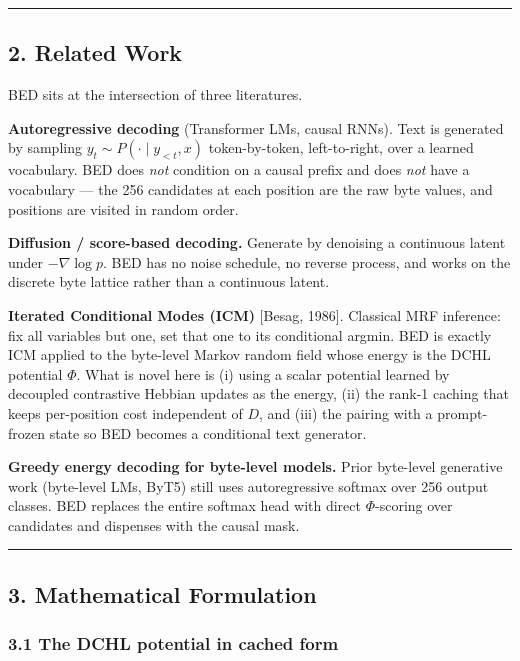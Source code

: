 \documentclass[
  11pt,
  a4paper,
]{article}
\begin{document}
\begin{center}\rule{0.5\linewidth}{0.5pt}\end{center}

\subsection{2. Related Work}\label{related-work}

BED sits at the intersection of three literatures.

\textbf{Autoregressive decoding} (Transformer LMs, causal RNNs). Text is
generated by sampling \(y_t \sim P(\cdot \mid y_{<t}, x)\)
token-by-token, left-to-right, over a learned vocabulary. BED does
\emph{not} condition on a causal prefix and does \emph{not} have a
vocabulary --- the 256 candidates at each position are the raw byte
values, and positions are visited in random order.

\textbf{Diffusion / score-based decoding.} Generate by denoising a
continuous latent under \(-\nabla \log p\). BED has no noise schedule,
no reverse process, and works on the discrete byte lattice rather than a
continuous latent.

\textbf{Iterated Conditional Modes (ICM)} {[}Besag, 1986{]}. Classical
MRF inference: fix all variables but one, set that one to its
conditional argmin. BED is exactly ICM applied to the byte-level Markov
random field whose energy is the DCHL potential \(\Phi\). What is novel
here is (i) using a scalar potential learned by decoupled contrastive
Hebbian updates as the energy, (ii) the rank-1 caching that keeps
per-position cost independent of \(D\), and (iii) the pairing with a
prompt-frozen state so BED becomes a conditional text generator.

\textbf{Greedy energy decoding for byte-level models.} Prior byte-level
generative work (byte-level LMs, ByT5) still uses autoregressive softmax
over 256 output classes. BED replaces the entire softmax head with
direct \(\Phi\)-scoring over candidates and dispenses with the causal
mask.

\begin{center}\rule{0.5\linewidth}{0.5pt}\end{center}

\subsection{3. Mathematical Formulation}\label{mathematical-formulation}

\subsubsection{3.1 The DCHL potential in cached
form}\label{the-dchl-potential-in-cached-form}
\end{document}
